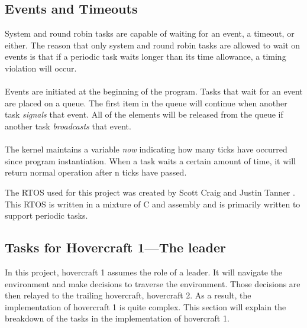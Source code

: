 \subsection{Events and Timeouts}

System and round robin tasks are capable of waiting for an event, a timeout, or
either. The reason that only system and round robin tasks are allowed to wait on events is that if a periodic task waits longer than its time allowance, a timing violation will occur. \\

\\
Events are initiated at the beginning of the program. Tasks that wait for an event are placed on a queue. The first item in the queue will continue when another task \textit{signals} that event. All of the elements will be released from the queue if another task \textit{broadcasts} that event. \\

\\
The kernel maintains a variable \textit{now} indicating how many ticks have occurred since program instantiation. When a task waits a certain amount of time, it will return normal operation after n ticks have passed.





The RTOS used for this project was created by Scott Craig and Justin Tanner \cite{RTOSSJ}. This RTOS is written in a mixture of C and assembly and is primarily written to support periodic tasks.   






\subsection{Tasks for Hovercraft 1---The leader}
In this project, hovercraft 1 assumes the role of a leader. It will navigate the
environment and make decisions to traverse the environment. Those decisions are then relayed to the trailing hovercraft, hovercraft 2. As a result, the implementation of hovercraft 1 is quite complex. This section will explain the
breakdown of the tasks in the implementation of hovercraft 1.

